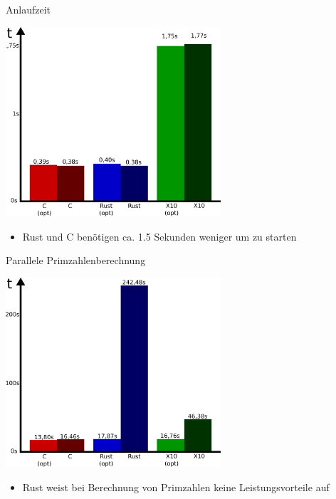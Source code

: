 \begin{frame}{Anlaufzeit}
  \begin{center}
    \includegraphics[width=0.6\textwidth]{images/startup-eval.pdf}
  \end{center}
  \begin{itemize}
    \item Rust und C benötigen ca. 1.5 Sekunden weniger um zu starten
  \end{itemize}
\end{frame}

\begin{frame}{Parallele Primzahlenberechnung}
  \begin{center}
    \includegraphics[width=0.6\textwidth]{images/primes-eval.pdf}
  \end{center}
  \begin{itemize}
    \item Rust weist bei Berechnung von Primzahlen keine Leistungsvorteile auf
  \end{itemize}
\end{frame}

